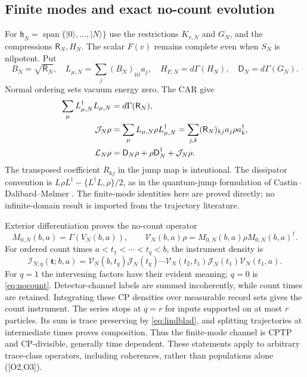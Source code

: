 \documentclass[11pt,letterpaper]{article}
\numberwithin{equation}{section}
\theoremstyle{remark}
\newcommand{\ket}[1]{\lvert #1\rangle}
\newcommand{\loss}{\mathsf R}
\newcommand{\ev}[1]{\textsf{[#1]}}
\begin{document}
\subsection{Finite modes and exact no-count evolution}
For $\mathfrak h_N=\operatorname{span}\{\ket0,\ldots,\ket N\}$ use the
restrictions $K_{v,N}$ and $G_N$, and the compressions $\loss_N,H_N$.
The scalar $F(v)$ remains complete even when $S_N$ is nilpotent. Put
\begin{equation}
 B_N=\sqrt{\loss_N},\quad L_{\mu,N}=\sum_j(B_N)_{\mu j}a_j,
 \quad H_{F,N}=d\Gamma(H_N),\quad \mathsf D_N=d\Gamma(G_N).
 \label{eq:lossrow}
\end{equation}
Normal ordering sets vacuum energy zero. The CAR give
\begin{align}
 \sum_\mu L_{\mu,N}^\dagger L_{\mu,N}&=d\Gamma(\loss_N),\notag\\
 \mathcal J_N\rho&=\sum_\mu L_{\mu,N}\rho L_{\mu,N}^\dagger
 =\sum_{j,k}(\loss_N)_{kj}a_j\rho a_k^\dagger,\notag\\
 \mathcal L_N\rho&=\mathsf D_N\rho+\rho\mathsf D_N^\dagger+
 \mathcal J_N\rho. \label{eq:lindblad}
\end{align}
The transposed coefficient $R_{kj}$ in the jump map is intentional.
The dissipator convention is $L\rho L^\dagger-\{L^\dagger L,\rho\}/2$,
as in the quantum-jump formulation of
Castin--Dalibard--M\o lmer \cite{CastinDalibardMolmer08054002v1}.
The finite-mode identities here are proved directly; no infinite-domain
result is imported from the trajectory literature.

Exterior differentiation proves the no-count operator
\begin{equation}
 M_{0,N}(b,a)=\Gamma(V_N(b,a)),\qquad
 \mathcal V_N(b,a)\rho=M_{0,N}(b,a)\rho M_{0,N}(b,a)^\dagger.
 \label{eq:nocount}
\end{equation}
For ordered count times $a<t_1<\cdots<t_q<b$, the instrument density is
\begin{equation}
 \mathcal I_{N;q}(\mathbf t;b,a)=
 \mathcal V_N(b,t_q)\mathcal J_N(t_q)\cdots
 \mathcal V_N(t_2,t_1)\mathcal J_N(t_1)\mathcal V_N(t_1,a).
 \label{eq:instrument}
\end{equation}
For $q=1$ the intervening factors have their evident meaning; $q=0$
is \eqref{eq:nocount}. Detector-channel labels are summed incoherently,
while count times are retained. Integrating these CP densities over
measurable record sets gives the count instrument. The series stops
at $q=r$ for inputs supported on at most $r$ particles. Its sum is
trace preserving by \eqref{eq:lindblad}, and splitting trajectories
at intermediate times proves composition. Thus the finite-mode
channel is CPTP and CP-divisible, generally time dependent.
These statements apply to arbitrary trace-class operators, including
coherences, rather than populations alone (\ev{O2,O3}).
\end{document}
